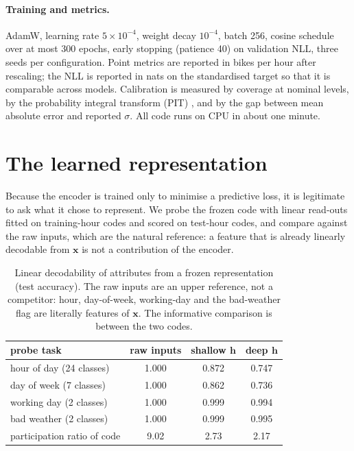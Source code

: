 \documentclass[11pt,a4paper]{article}
\newcommand{\hvec}{\mathbf{h}}
\newcommand{\xvec}{\mathbf{x}}
\begin{document}
\paragraph{Training and metrics.}
AdamW, learning rate $5\times10^{-4}$, weight decay $10^{-4}$, batch 256, cosine schedule over at most
300 epochs, early stopping (patience 40) on validation NLL, three seeds per configuration. Point
metrics are reported in bikes per hour after rescaling; the NLL is reported in nats on the
standardised target so that it is comparable across models. Calibration is measured by coverage at
nominal levels, by the probability integral transform (PIT) \cite{dawid1984}, and by the gap between
mean absolute error and reported $\sigma$. All code runs on CPU in about one minute.

\section{The learned representation}

Because the encoder is trained only to minimise a predictive loss, it is legitimate to ask what it
chose to represent. We probe the frozen code with linear read-outs fitted on training-hour codes and
scored on test-hour codes, and compare against the raw inputs, which are the natural reference: a
feature that is already linearly decodable from $\xvec$ is not a contribution of the encoder.

\begin{table}[t]
\centering
\caption{Linear decodability of attributes from a frozen representation (test accuracy). The raw
inputs are an upper reference, not a competitor: hour, day-of-week, working-day and the bad-weather
flag are literally features of $\xvec$. The informative comparison is between the two codes.}
\label{tab:probes}
\small
\begin{tabular}{lccc}
\toprule
probe task & raw inputs & shallow $\hvec$ & deep $\hvec$ \\
\midrule
hour of day (24 classes)      & 1.000 & 0.872 & 0.747 \\
day of week (7 classes)       & 1.000 & 0.862 & 0.736 \\
working day (2 classes)       & 1.000 & 0.999 & 0.994 \\
bad weather (2 classes)       & 1.000 & 0.999 & 0.995 \\
\midrule
participation ratio of code   & 9.02  & 2.73  & 2.17 \\
\bottomrule
\end{tabular}
\end{table}
\end{document}
